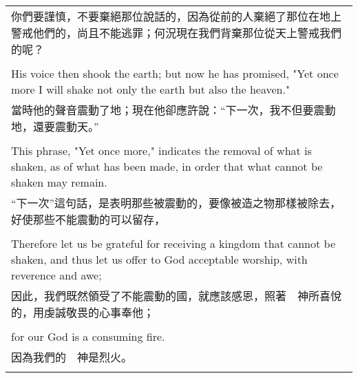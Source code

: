\begin{tabularx}{\textwidth}{p{}}
你們要謹慎，不要棄絕那位說話的，因為從前的人棄絕了那位在地上警戒他們的，尚且不能逃罪；何況現在我們背棄那位從天上警戒我們的呢？ \\ \\
His voice then shook the earth; but now he has promised, "Yet once more I will shake not only the earth but also the heaven." \\
當時他的聲音震動了地；現在他卻應許說：“下一次，我不但要震動地，還要震動天。” \\ \\
This phrase, "Yet once more," indicates the removal of what is shaken, as of what has been made, in order that what cannot be shaken may remain. \\
“下一次”這句話，是表明那些被震動的，要像被造之物那樣被除去，好使那些不能震動的可以留存， \\ \\
Therefore let us be grateful for receiving a kingdom that cannot be shaken, and thus let us offer to God acceptable worship, with reverence and awe; \\
因此，我們既然領受了不能震動的國，就應該感恩，照著　神所喜悅的，用虔誠敬畏的心事奉他； \\ \\
for our God is a consuming fire. \\
因為我們的　神是烈火。 \\ \\

\hline
\end{tabularx}

\newpage

